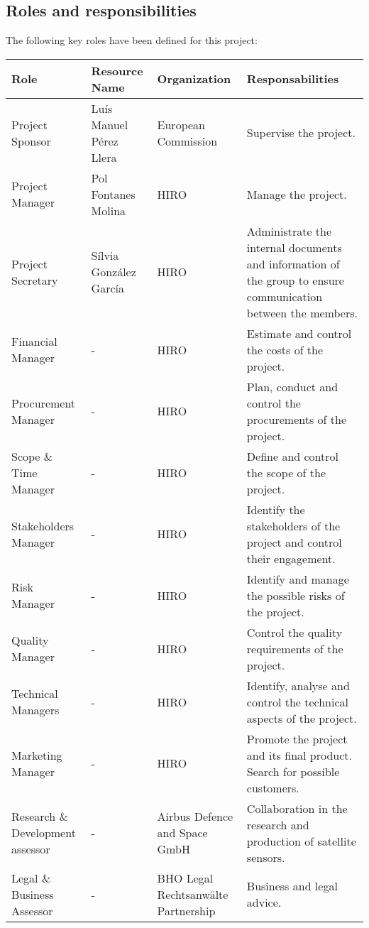 \subsection{Roles and responsibilities}
The following key roles have been defined for this project:
\begin{center}
	\begin{longtable}{>{\raggedright\arraybackslash}p{3cm}>{\raggedright\arraybackslash}p{3cm}>{\raggedright\arraybackslash}p{3cm}>{\raggedright\arraybackslash}p{5cm}}
		\toprule[2pt]
		\textbf{Role} & \textbf{Resource Name} & \textbf{Organization} & \textbf{Responsabilities} \\ \midrule[1.5pt] \endhead
		Project Sponsor & Luís Manuel Pérez Llera & European Commission & Supervise the project. \\ \hline
		Project Manager & Pol Fontanes Molina & HIRO & Manage the project. \\ \hline
		Project Secretary & Sílvia González García & HIRO & Administrate the internal documents and information of the group to ensure communication between the members. \\ \hline
		Financial Manager & - & HIRO & Estimate and control the costs of the project. \\ \hline
		Procurement Manager & - & HIRO & Plan, conduct and control the procurements of the project.\\ \hline
		Scope \& Time Manager & - & HIRO & Define and control the scope of the project. \\ \hline
		Stakeholders Manager & - & HIRO & Identify the stakeholders of the project and control their engagement. \\ \hline
		Risk Manager & - & HIRO & Identify and manage the possible risks of the project. \\ \hline
		Quality Manager & - & HIRO & Control the quality requirements of the project. \\ \hline
		Technical Managers & - & HIRO & Identify, analyse and control the technical aspects of the project. \\ \hline
		Marketing Manager & - & HIRO & Promote the project and its final product. Search for possible customers. \\ \hline
		Research \& Development assessor & - & Airbus Defence and Space GmbH & Collaboration in the research and production of satellite sensors. \\ \hline
		Legal \& Business Assessor & - & BHO Legal Rechtsanwälte Partnership & Business and legal advice. \\ \hline

\end{longtable}
\end{center}
